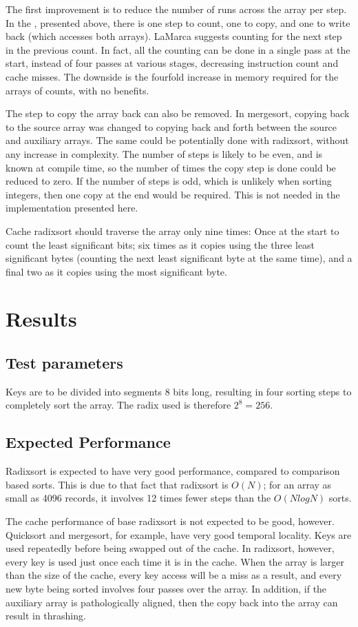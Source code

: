 The first improvement is to reduce the number of runs across the array per
step.  In the , presented above, there is one step to count,
one to copy, and one to write back (which accesses both arrays). LaMarca
suggests counting for the next step in the previous count. In fact, all the
counting can be done in a single pass at the start, instead of four passes at
various stages, decreasing instruction count and cache misses. The downside is
the fourfold increase in memory required for the arrays of counts, with no
benefits.

The step to copy the array back can also be removed. In mergesort, copying back
to the source array was changed to copying back and forth between the source and 
auxiliary arrays. The same could be potentially done with radixsort, without any
increase in complexity. The number of steps is likely to be even, and is known
at compile time, so the number of times the copy step is done could be reduced
to zero. If the number of steps is odd, which is unlikely when sorting
integers, then one copy at the end would be required. This is not needed in the
implementation presented here.

Cache radixsort should traverse the array only nine times: Once at the start to
count the least significant bits; six times as it copies using the three least
significant bytes (counting the next least significant byte at the same time),
and a final two as it copies using the most significant byte.

\section{Results}
\subsection{Test parameters}
Keys are to be divided into segments 8 bits long, resulting in four sorting
steps to completely sort the array. The radix used is therefore $2^8 = 256$.

\subsection{Expected Performance}
Radixsort is expected to have very good performance, compared to comparison
based sorts. This is due to that fact that radixsort is $O(N)$; for an array as
small as 4096 records, it involves 12 times fewer steps than the $O(NlogN)$
sorts.

The cache performance of base radixsort is not expected to be good, however.
Quicksort and mergesort, for example, have very good temporal locality. Keys are
used repeatedly before being swapped out of the cache. In radixsort, however,
every key is used just once each time it is in the cache. When the array is larger than
the size of the cache, every key access will be a miss as a result, and every
new byte being sorted involves four passes over the array. In addition, if the
auxiliary array is pathologically aligned, then the copy back into the array
can result in thrashing.

